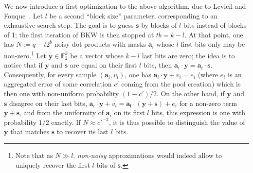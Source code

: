 \documentclass[11pt,a4paper]{article}
\theoremstyle{definition}
\DeclareMathOperator\walsh{\mathcal{W}}
\newcommand\ftwo{\mathbb{F}_{2}}
\begin{document}
\medskip

We now introduce a first optimization to the above algorithm, due to Levieil and Fouque~\cite{LF}. Let $l$ be a second ``block size'' parameter, corresponding to an exhaustive search step.
The goal is to guess $\bm{s}$ by blocks of $l$ bits instead of blocks of 1; the first iteration of BKW is then stopped at $tb = k -l$. At that point, one has $N := q - t2^b$ noisy
dot products with masks $\bm{a}_i$ whose $l$ first bits only may be non-zero.\footnote{Note that as $N \gg l$, \emph{non-noisy} approximations would indeed allow to uniquely recover the first $l$ bits of $\bm{s}$.}
Let $\bm{y} \in \ftwo^k$ be a vector whose $k-l$ last bits are zero; the idea is to notice that if $\bm{y}$ and $\bm{s}$ are equal on their first $l$ bits, then $\bm{a}_i \cdot \bm{y} = \bm{a}_i \cdot \bm{s}$.
Consequently, for every sample $(\bm{a}_i, v_i)$, one has $\bm{a}_i \cdot \bm{y} + v_i = e_i$ (where $e_i$ is an aggregated error of some correlation $c'$ coming from the pool creation) which is then
one with non-uniform probability $(1-c')/2$. On the other hand,
if $\bm{y}$ and $\bm{s}$ disagree on their last bits, $\bm{a}_i \cdot \bm{y} + v_i = \bm{a_i} \cdot (\bm{y} + \bm{s}) + e_i$ for a non-zero term $\bm{y}+\bm{s}$, and from the uniformity of $\bm{a}_i$ on its first $l$ bits,
this expression is one with probability $1/2$ exactly. If $N \approx c'^{-2}$, it is thus possible to distinguish the value of $\bm{y}$ that matches $\bm{s}$ to recover its last $l$ bits.

\end{document}
